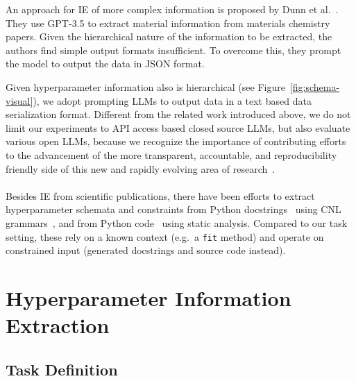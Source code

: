 An approach for IE of more complex information is proposed by Dunn et al.~\cite{Dunn2022}. They use GPT-3.5 to extract material information from materials chemistry papers. Given the hierarchical nature of the information to be extracted, the authors find simple output formats insufficient. To overcome this, they prompt the model to output the data in JSON format.

Given hyperparameter information also is hierarchical (see Figure~\ref{fig:schema-visual}), we adopt prompting LLMs to output data in a text based data serialization format. Different from the related work introduced above, we do not limit our experiments to API access based closed source LLMs, but also evaluate various open LLMs, because we recognize the importance of contributing efforts to the advancement of the more transparent, accountable, and reproducibility friendly side of this new and rapidly evolving area of research~\cite{Liesenfeld2023}.\\
\\
Besides IE from scientific publications, there have been efforts to extract hyperparameter schemata and constraints from Python docstrings~\cite{Baudart2020} using CNL grammars~\cite{Kuhn2014}, and from Python code~\cite{RakAmnouykit2021} using static analysis. Compared to our task setting, these rely on a known context (e.g.\ a \texttt{fit} method) and operate on constrained input (generated docstrings and source code instead).

\section{Hyperparameter Information Extraction}\label{sec:hyperpie}


\subsection{Task Definition}

